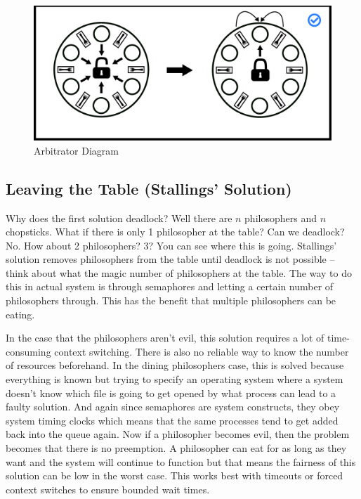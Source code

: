 \begin{figure}[H]
\centering
\includegraphics[width=.9\textwidth]{deadlock/drawings/dining_arbitrator.eps}
\caption{Arbitrator Diagram}
\end{figure}

\subsection{Leaving the Table (Stallings' Solution)}

Why does the first solution deadlock?
Well there are $n$ philosophers and $n$ chopsticks.
What if there is only 1 philosopher at the table?
Can we deadlock?
No.
How about 2 philosophers?
3?
You can see where this is going.
Stallings' \cite[P. 280]{stalling} solution removes philosophers from the table until deadlock is not possible -- think about what the magic number of philosophers at the table.
The way to do this in actual system is through semaphores and letting a certain number of philosophers through.
This has the benefit that multiple philosophers can be eating.

In the case that the philosophers aren't evil, this solution requires a lot of time-consuming context switching.
There is also no reliable way to know the number of resources beforehand.
In the dining philosophers case, this is solved because everything is known but trying to specify an operating system where a system doesn't know which file is going to get opened by what process can lead to a faulty solution.
And again since semaphores are system constructs, they obey system timing clocks which means that the same processes tend to get added back into the queue again.
Now if a philosopher becomes evil, then the problem becomes that there is no preemption.
A philosopher can eat for as long as they want and the system will continue to function but that means the fairness of this solution can be low in the worst case.
This works best with timeouts or forced context switches to ensure bounded wait times.

